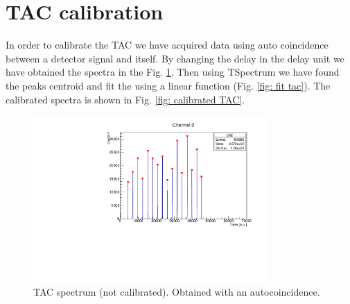 \documentclass[a4paper,11pt]{article}
\begin{document}
%
%
\clearpage
\section*{TAC calibration}
In order to calibrate the TAC we have acquired data using auto coincidence between a detector signal and itself. By changing the delay in the delay unit we have obtained the spectra in the Fig. \ref{fig: uncalibrated TAC}. Then using TSpectrum we have found the peaks centroid and fit the using a linear function (Fig. \ref{fig: fit tac}). The calibrated spectra is shown in Fig. \ref{fig: calibrated TAC}.
\begin{figure}[h!]
\centering
\includegraphics[width=0.8\textwidth]{tac_uncalibrated_spectrum.pdf}
\caption{TAC spectrum (not calibrated). Obtained with an autocoincidence.}
\label{fig: uncalibrated TAC}
\end{figure}
\end{document}
